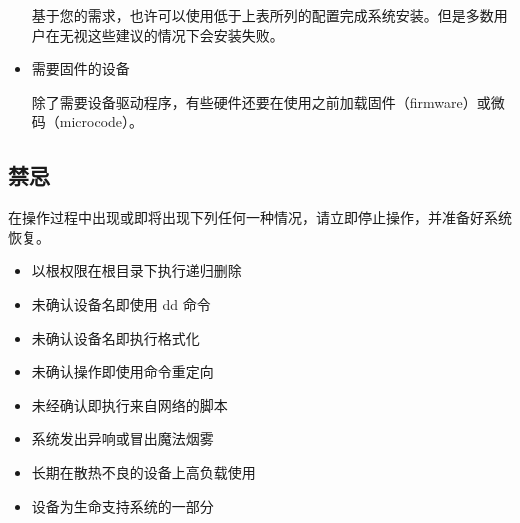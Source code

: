 \documentclass{article}
\begin{document}
\begin{multicols*}{3}
\begin{itemize}[leftmargin=*]
		基于您的需求，也许可以使用低于上表所列的配置完成系统安装。但是多数用户在无视这些建议的情况下会安装失败。

		\item 需要固件的设备

		除了需要设备驱动程序，有些硬件还要在使用之前加载固件（firmware）或微码（microcode）。

	\end{itemize}


	\begin{tcolorbox}
	\section*{禁忌}
	\end{tcolorbox}

	在操作过程中出现或即将出现下列任何一种情况，请立即停止操作，并准备好系统恢复。

	\begin{itemize}[leftmargin=*]
		\setlength{\itemsep}{0pt}
		\setlength{\parskip}{0pt}
		\setlength{\parsep}{0pt}

		\item 以根权限在根目录下执行递归删除
		\item 未确认设备名即使用 dd 命令
		\item 未确认设备名即执行格式化
		\item 未确认操作即使用命令重定向
		\item 未经确认即执行来自网络的脚本
		\item 系统发出异响或冒出魔法烟雾
		\item 长期在散热不良的设备上高负载使用
		\item 设备为生命支持系统的一部分
	\end{itemize}







\end{multicols*}
\end{document}
